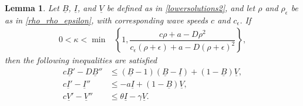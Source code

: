 \documentclass[11pt]{article}
\newtheorem{lemma}[thm]{Lemma}
\theoremstyle{definition}
\begin{document}
\begin{lemma}
    Let $\underline{B}$, $\underline{I}$, and $\underline{V}$ be defined as in \eqref{lowersolutions2}, and let $\rho$ and $\rho_{\epsilon}$ be as in \eqref{rho_rho_epsilon}, with corresponding wave speeds $c$ and $c_{\epsilon}$.
    If \begin{align}
      0<  \kappa< \min &\left\{{1,\dfrac{c\rho+a-D\rho^2}{c_\epsilon(\rho+\epsilon)+a-D(\rho+\epsilon)^2}}\right\}, 
    \end{align} then the following inequalities are satisfied 
    \begin{align} \label{lower_lemma_inequalitoes}
    \nonumber    c \underline{B}'- D \underline{B}'' 
 &\leq( \underline{B}-1)(\underline{B}- \underline{I})+(1-\underline{B})\underline{V}, \\  c \underline{I}'-  \underline{I}'' 
 &\leq -a\underline{I}+ (1-\underline{B})\underline{V}, \\  \nonumber c \underline{V}'-  \underline{V}'' 
 &\leq \theta \underline{I} - \gamma \underline{V}.
    \end{align}
\end{lemma}
\end{document}
